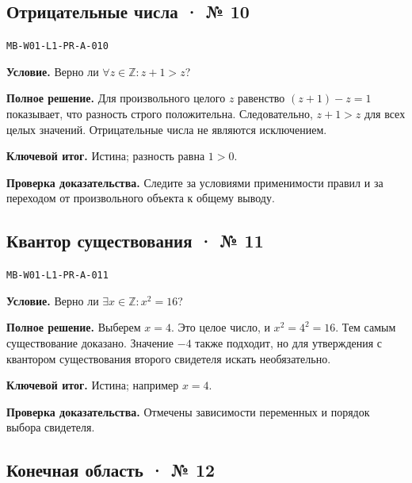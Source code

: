 \documentclass[11pt,a4paper,openany]{book}
\newcommand{\muid}[1]{\texttt{\footnotesize #1}}
\begin{document}
\subsection*{Отрицательные числа · № 10}\hypertarget{solution:MB-W01-L1-PR-A-010}{}

\muid{MB-W01-L1-PR-A-010}\par

\textbf{Условие.} Верно ли $\forall z\in\mathbb Z\colon z+1>z$?\par

\textbf{Полное решение.} Для произвольного целого $z$ равенство $(z+1)-z=1$ показывает, что разность строго положительна. Следовательно, $z+1>z$ для всех целых значений. Отрицательные числа не являются исключением.


\begin{learnbox}\textbf{Ключевой итог.} Истина; разность равна $1>0$.\par \textbf{Проверка доказательства.} 
Следите за условиями применимости правил и за переходом от произвольного объекта к общему выводу. 
\end{learnbox}

\subsection*{Квантор существования · № 11}\hypertarget{solution:MB-W01-L1-PR-A-011}{}

\muid{MB-W01-L1-PR-A-011}\par

\textbf{Условие.} Верно ли $\exists x\in\mathbb Z\colon x^2=16$?\par

\textbf{Полное решение.} Выберем $x=4$. Это целое число, и $x^2=4^2=16$. Тем самым существование доказано. Значение $-4$ также подходит, но для утверждения с квантором существования второго свидетеля искать необязательно.


\begin{learnbox}\textbf{Ключевой итог.} Истина; например $x=4$.\par \textbf{Проверка доказательства.} 
Отмечены зависимости переменных и порядок выбора свидетеля. 
\end{learnbox}

\subsection*{Конечная область · № 12}\hypertarget{solution:MB-W01-L1-PR-A-012}{}
\end{document}
